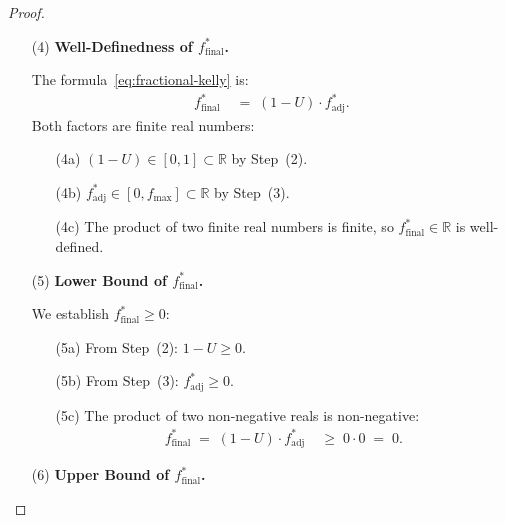 \documentclass[12pt,openany]{book}
\numberwithin{equation}{chapter}
\theoremstyle{plain}
\theoremstyle{definition}
\theoremstyle{remark}
\numberwithin{equation}{chapter}
\theoremstyle{plain}
\begin{document}
\begin{proof}
\begin{enumerate}
  \item[\textup{(4)}] \textbf{Well-Definedness of
        $f^*_{\mathrm{final}}$.}

        The formula~\eqref{eq:fractional-kelly} is:
        \begin{align}
          f^*_{\mathrm{final}}
            &\;=\; (1 - U)\cdot f^*_{\mathrm{adj}}.
          \label{eq:ffinal-def-repeat}
        \end{align}
        Both factors are finite real numbers:
        \begin{enumerate}
          \item[\textup{(4a)}] $(1-U) \in [0,1] \subset
                \mathbb{R}$ by Step~(2).
          \item[\textup{(4b)}] $f^*_{\mathrm{adj}} \in
                [0, f_{\max}] \subset \mathbb{R}$ by
                Step~(3).
          \item[\textup{(4c)}] The product of two finite
                real numbers is finite, so
                $f^*_{\mathrm{final}} \in \mathbb{R}$
                is well-defined.
        \end{enumerate}

  \item[\textup{(5)}] \textbf{Lower Bound of
        $f^*_{\mathrm{final}}$.}

        We establish $f^*_{\mathrm{final}} \geq 0$:
        \begin{enumerate}
          \item[\textup{(5a)}] From Step~(2):
                $1 - U \geq 0$.
          \item[\textup{(5b)}] From Step~(3):
                $f^*_{\mathrm{adj}} \geq 0$.
          \item[\textup{(5c)}] The product of two
                non-negative reals is non-negative:
                \begin{align}
                  f^*_{\mathrm{final}}
                  \;=\; (1-U)\cdot f^*_{\mathrm{adj}}
                  &\;\geq\; 0 \cdot 0
                  \;=\; 0.
                  \label{eq:ffinal-lb}
                \end{align}
        \end{enumerate}

  \item[\textup{(6)}] \textbf{Upper Bound of
        $f^*_{\mathrm{final}}$.}


\end{enumerate}
\end{proof}
\end{document}
